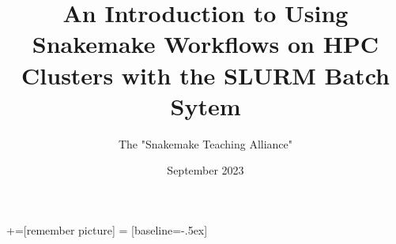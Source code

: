 \documentclass[english,xcolor=pdftex,dvipsnames]{beamer}
\title[Introduction to Using Snakemake Workflows on Clusters]{An Introduction to Using Snakemake Workflows on HPC Clusters with the SLURM Batch Sytem}
\author[Snakemake Teaching Alliance]{The "Snakemake Teaching Alliance"}
\date{September 2023}
\begin{document}

\setlength\abovecaptionskip{-2.5pt}
\setlength\belowcaptionskip{0pt}



+=[remember picture]
 = [baseline=-.5ex]

\begin{frame}[plain] %
  \titlepage
\end{frame}







%

%





%
      
    
      
\end{document}
